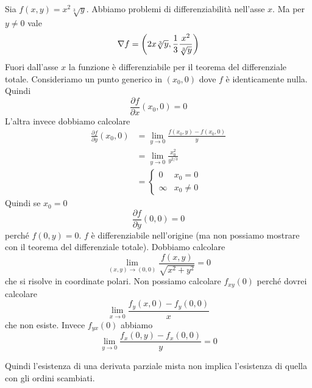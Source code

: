 \documentclass[a4paper]{article}
\begin{document}
\begin{radioactive}
\begin{snippetexample}{}
    Sia \(f(x,y) = x^2 \sqrt[3]{y}\).
    Abbiamo problemi di differenziabilità nell'asse \(x\).
    Ma per \(y \neq 0\) vale
    \[
        \nabla f = \left(2x\sqrt[3]{y}, \frac{1}{3}\frac{x^2}{\sqrt[3]{y}}\right)
    \]
    Fuori dall'asse \(x\) la funzione è differenziabile per il teorema del differenziale totale.
    Consideriamo un punto generico in \((x_0, 0)\)
    dove \(f\) è identicamente nulla. Quindi
    \[
        \frac{\partial f}{\partial x} (x_0, 0) = 0
    \]
    L'altra invece dobbiamo calcolare
    \begin{align*}
        \frac{\partial f}{\partial y}(x_0, 0)
        &= \lim_{y\to 0} \frac{f(x_0, y) - f(x_0, 0)}{y} \\
        &= \lim_{y\to 0} \frac{x_0^2}{y^{2/3}} \\
        &= \begin{cases}
            0 & x_0 = 0 \\
            \infty & x_0 \neq 0
        \end{cases}
    \end{align*}
    Quindi se \(x_0 = 0\)
    \[
        \frac{\partial f}{\partial y}(0,0) = 0
    \]
    perché \(f(0,y) = 0\).
    \(f\) è differenziabile nell'origine (ma non possiamo mostrare con il teorema del differenziale totale).
    Dobbiamo calcolare
    \[
        \lim_{(x,y) \to (0,0)} \frac{f(x,y)}{\sqrt{x^2 + y^2}} = 0
    \]
    che si risolve in coordinate polari.
    Non possiamo calcolare \(f_{xy}(0)\) perché dovrei calcolare
    \[
        \lim_{x \to 0} \frac{f_y(x, 0) - f_y(0,0)}{x}
    \]
    che non esiste.
    Invece \(f_{yx}(0)\) abbiamo
    \[
        \lim_{y \to 0} \frac{f_x(0,y) - f_x(0,0)}{y} = 0
    \]
\end{snippetexample}
\end{radioactive}

\begin{radioactive}
Quindi l'esistenza di una derivata parziale mista non implica l'esistenza
di quella con gli ordini scambiati.
\end{radioactive}
\end{document}
